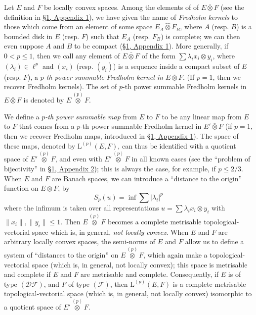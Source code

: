 \documentclass[british]{article}
\newcommand{\oldpage}[1]{\marginpar{\footnotesize$\Big\vert$ \textit{p.~#1}}}
\begin{document}
Let \(E\) and \(F\) be locally convex spaces. Among the elements of of
\(E\bar{\otimes}F\) (see the definition in
\hyperref[section-1-appendix-1]{§1, Appendix 1}), we have given the name
of \emph{Fredholm kernels} to those which come from an element of some
space \(E_A\hat{\otimes}F_B\), where \(A\) (resp. \(B\)) is a bounded
disk in \(E\) (resp. \(F\)) such that \(E_A\) (resp. \(F_B\)) is
complete; we can then even suppose \(A\) and \(B\) to be compact
(\hyperref[section-1-appendix-1]{§1, Appendix 1}). More generally, if
\(0<p\leqslant 1\), then we call any element of \(E\bar{\otimes}F\) of
the form \(\sum\lambda_i x_i\otimes y_i\), where
\((\lambda_i)\in\ell^p\) and \((x_i)\) (resp. \((y_i)\)) is a sequence
inside a compact subset of \(E\) (resp. \(F\)), a \emph{\(p\)-th power
summable Fredholm kernel in \(E\bar{\otimes}F\)}. (If \(p=1\), then we
recover Fredholm kernels). The set of \(p\)-th power summable Fredholm
kernels in \(E\bar{\otimes}F\) is denoted by
\(E\overset{(p)}{\otimes}F\).

We define a \emph{\(p\)-th power summable map} from \(E\) to \(F\) to be
any linear map from \(E\) to \(F\) that comes from a \(p\)-th power
summable Fredholm kernel in \(E'\bar{\otimes}F\) (if \(p=1\), then we
recover Fredholm maps, introduced in \hyperref[section-1-appendix-1]{§1,
Appendix 1}). The space of these maps, denoted by
\(\mathrm{L}^{(p)}(E,F)\), can thus be identified with a quotient space
of \(E'\overset{(p)}{\otimes}F\), and even with
\(E'\overset{(p)}{\otimes}F\) in all known cases (see the ``problem of
bijectivity'' in \hyperref[section-1-appendix-2]{§1, Appendix 2}); this
is always the case, for example, if \(p\leqslant 2/3\). When \(E\) and
\(F\) are Banach spaces, we can introduce a ``distance to the origin''
function on \(E\otimes F\), by \[
  S_p(u) = \inf\sum|\lambda_i|^p
\] where the infimum is taken over all representations
\(u=\sum\lambda_i x_i\otimes y_i\) with \(\|x_i\|,\|y_i\|\leqslant 1\).
Then \(E\overset{(p)}{\otimes}F\) becomes a complete metrisable
topological-vectorial space which is, in general, \emph{not locally
convex}. When \(E\) and \(F\) are arbitrary locally convex spaces, the
semi-norms of \(E\) and \(F\) allow us to define a system of ``distances
to the origin'' on \(E\overset{(p)}{\otimes}F\), which again make a
topological-vectorial space (which is, in general, not locally convex);
\oldpage{107} this space is metrisable and complete if \(E\) and \(F\)
are metrisable and complete. Consequently, if \(E\) is of type
\((\mathscr{DF})\), and \(F\) of type \((\mathscr{F})\), then
\(\mathrm{L}^{(p)}(E,F)\) is a complete metrisable topological-vectorial
space (which is, in general, not locally convex) isomorphic to a
quotient space of \(E'\overset{(p)}{\otimes}F\).
\end{document}
